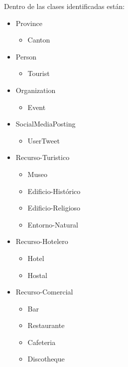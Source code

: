 \documentclass[lnbip,sechang,a4paper]{svmultln}
\begin{document}
\begin{itemize}
Dentro de las clases identificadas están: 

\begin{multicols}{2} 
\begin{itemize}
    \item Province
        \begin{itemize}
         \item Canton
        \end{itemize}
    \item Person
        \begin{itemize}
         \item Tourist
        \end{itemize}
    \item Organization
        \begin{itemize}
         \item Event
        \end{itemize}
    \item SocialMediaPosting
        \begin{itemize}
         \item UserTweet
    \end{itemize}
    \item Recurso-Turistico
        \begin{itemize}
         \item Museo
         \item Edificio-Histórico
         \item Edificio-Religioso
         \item Entorno-Natural
    \end{itemize}  
    \item Recurso-Hotelero
        \begin{itemize}
         \item Hotel
         \item Hostal
    \end{itemize}
    \item Recurso-Comercial
        \begin{itemize}
         \item Bar
         \item Restaurante
         \item Cafeteria
         \item Discotheque
    \end{itemize}
\end{itemize}
\end{multicols} 


\end{itemize}
\end{document}
